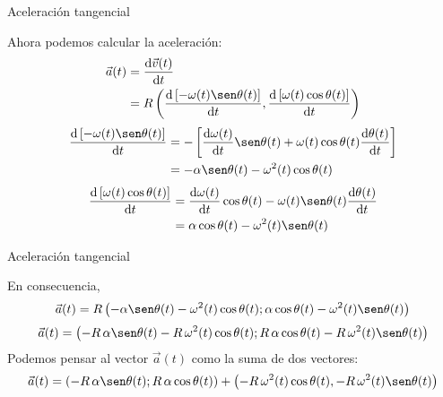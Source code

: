 \documentclass[11pt,handout,aspectratio=1610]{beamer}
\newcommand{\fdiff}[2]{\dfrac{\text{d} #1}{\text{d} #2}}
\begin{document}
\begin{frame}{Aceleración tangencial}

    Ahora podemos calcular la aceleración:
    \begin{equation*}
        \begin{split}
            \vec{a} (t) &= \fdiff{\vec{v}(t)}{t} \\
                        &= R \left(\fdiff{\left[- \omega(t) \sen \theta (t)\right]}{t},\fdiff{\left[\omega(t) \cos \theta (t)\right]}{t}\right)
        \end{split}
    \end{equation*} \pause
    \begin{equation*}
        \begin{split}
            \fdiff{\left[- \omega(t) \sen \theta (t)\right]}{t} &= - \left[\fdiff{\omega (t)}{t} \sen \theta (t) + \omega (t) \cos \theta(t) \fdiff{\theta (t)}{t} \right] \\
             &= - \alpha \sen \theta (t) - \omega^2 (t) \cos \theta(t)
        \end{split}
    \end{equation*} \pause
    \begin{equation*}
        \begin{split}
            \fdiff{\left[\omega(t) \cos \theta (t)\right]}{t} &= \fdiff{\omega (t)}{t} \cos \theta (t) - \omega (t) \sen \theta(t) \fdiff{\theta (t)}{t} \\
             &= \alpha \cos \theta (t) - \omega^2 (t) \sen \theta(t)
        \end{split}
    \end{equation*}

\end{frame}

\begin{frame}{Aceleración tangencial}

    En consecuencia,
    \begin{equation*}
        \vec{a} (t) = R \left(- \alpha \sen \theta (t) - \omega^2 (t) \cos \theta(t); \alpha \cos \theta (t) - \omega^2 (t) \sen \theta(t)\right)
    \end{equation*}
    \begin{equation*}
        \vec{a} (t) = \left(- R \, \alpha \sen \theta (t) - R \, \omega^2 (t) \cos \theta(t); R \, \alpha \cos \theta (t) - R \, \omega^2 (t) \sen \theta(t)\right)
    \end{equation*} Podemos pensar al vector $\vec{a} (t)$ como la suma de dos vectores:
    \begin{equation*}
        \vec{a} (t) = \left(- R \, \alpha \sen \theta (t); R \, \alpha \cos \theta (t)\right) + \left(- R \, \omega^2 (t) \cos \theta(t), - R \, \omega^2 (t) \sen \theta(t)\right)
    \end{equation*}

\end{frame}
\end{document}
